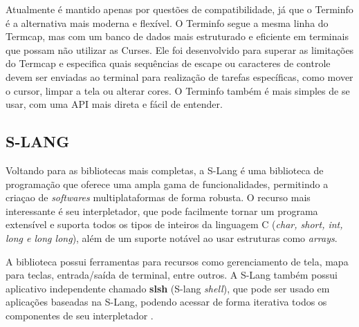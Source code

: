 \vspace{0.4cm}

\vspace{0.4cm}

Atualmente é mantido apenas por questões de compatibilidade, já que o Terminfo é
a alternativa mais moderna e flexível. O Terminfo segue a mesma linha do Termcap,
mas com um banco de dados mais estruturado e eficiente em terminais que possam não
utilizar as Curses. Ele foi desenvolvido para superar as limitações do Termcap e
especifica quais sequências de escape ou caracteres de controle devem ser
enviadas ao terminal para realização de tarefas específicas, como mover o cursor,
limpar a tela ou alterar cores. O Terminfo também é mais simples de se usar, com
uma API mais direta e fácil de entender. \cite{man7_terminfo, tldp_text_terminal_howto}

\vspace{0.4cm}

\vspace{0.4cm}

\subsection{S-LANG}

Voltando para as bibliotecas mais completas, a S-Lang é uma biblioteca de programação
que oferece uma ampla gama de funcionalidades, permitindo a criaçao de \textit{softwares}
multiplataformas de forma robusta. O recurso mais interessante é seu
interpletador, que pode facilmente tornar um programa extensível e suporta todos
os tipos de inteiros da linguagem C (\textit{char, short, int, long e long long}),
além de um suporte notável ao usar estruturas como \textit{arrays}.

A biblioteca possui ferramentas para recursos como gerenciamento de tela, mapa para
teclas, entrada/saída de terminal, entre outros. A S-Lang também possui
aplicativo independente chamado \textbf{slsh} (S-lang \textit{shell}), que pode ser
usado em aplicações baseadas na S-Lang, podendo acessar de forma iterativa todos
os componentes de seu interpletador \cite{Davis2022S_Lang}.

\vspace{0.4cm}

\vspace{0.4cm}